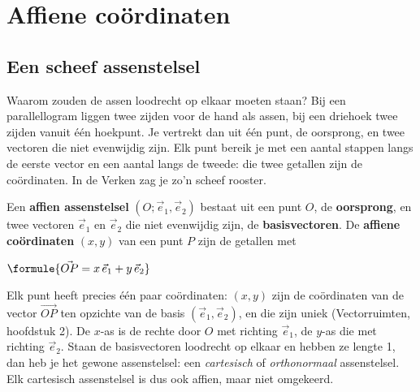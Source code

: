 \begin{oefeningen}[Start]

\end{oefeningen}

\section{Affiene coördinaten}

\subsection{Een scheef assenstelsel}

Waarom zouden de assen loodrecht op elkaar moeten staan? Bij een parallellogram liggen twee zijden voor de hand als assen, bij een driehoek twee zijden vanuit één hoekpunt. Je vertrekt dan uit één punt, de oorsprong, en twee vectoren die niet evenwijdig zijn. Elk punt bereik je met een aantal stappen langs de eerste vector en een aantal langs de tweede: die twee getallen zijn de coördinaten. In de Verken zag je zo'n scheef rooster.

\begin{theorie}
Een \textbf{\textcolor{accent}{affien assenstelsel}} $(O; \vec e_1, \vec e_2)$ bestaat uit een punt $O$, de \textbf{\textcolor{accent}{oorsprong}}, en twee vectoren $\vec e_1$ en $\vec e_2$ die niet evenwijdig zijn, de \textbf{\textcolor{accent}{basisvectoren}}. De \textbf{\textcolor{accent}{affiene coördinaten}} $(x, y)$ van een punt $P$ zijn de getallen met

\vspace{1mm}
\qquad $\formule{\vec{OP} = x\,\vec e_1 + y\,\vec e_2}$
\end{theorie}

Elk punt heeft precies één paar coördinaten: $(x, y)$ zijn de coördinaten van de vector $\vec{OP}$ ten opzichte van de basis $(\vec e_1, \vec e_2)$, en die zijn uniek (Vectorruimten, hoofdstuk 2). De $x$-as is de rechte door $O$ met richting $\vec e_1$, de $y$-as die met richting $\vec e_2$. Staan de basisvectoren loodrecht op elkaar en hebben ze lengte 1, dan heb je het gewone assenstelsel: een \emph{cartesisch} of \emph{orthonormaal} assenstelsel. Elk cartesisch assenstelsel is dus ook affien, maar niet omgekeerd.

